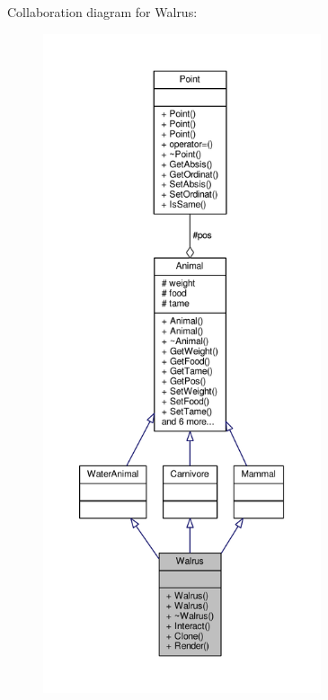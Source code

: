 Collaboration diagram for Walrus\+:
\nopagebreak
\begin{figure}[H]
\begin{center}
\leavevmode
\includegraphics[height=550pt]{classWalrus__coll__graph}
\end{center}
\end{figure}
